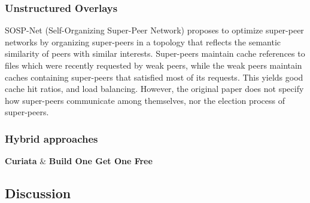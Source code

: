 \subsubsection{Unstructured Overlays}

SOSP-Net (Self-Organizing Super-Peer Network) \cite{garbacki2007optimizing} proposes to optimize super-peer networks by organizing super-peers in a topology that reflects the semantic similarity of peers with similar interests. Super-peers maintain cache references to files which were recently requested by weak peers, while the weak peers maintain caches containing super-peers that satisfied most of its requests. This yields good cache hit ratios, and load balancing. However, the original paper does not specify how super-peers communicate among themselves, nor the election process of super-peers.

\subsubsection{Hybrid approaches}

\textbf{Curiata} \& \textbf{Build One Get One Free}

\subsection{Discussion}







